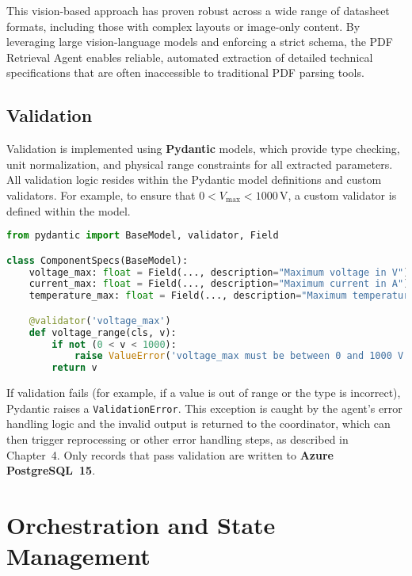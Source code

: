 This vision-based approach has proven robust across a wide range of datasheet formats, including those with complex layouts or image-only content. By leveraging large vision-language models and enforcing a strict schema, the PDF Retrieval Agent enables reliable, automated extraction of detailed technical specifications that are often inaccessible to traditional PDF parsing tools.

\subsection{Validation}
Validation is implemented using \textbf{Pydantic} models, which provide type checking, unit normalization, and physical range constraints for all extracted parameters. All validation logic resides within the Pydantic model definitions and custom validators. For example, to ensure that $0 < V_{\max} < 1000\,\mathrm{V}$, a custom validator is defined within the model.

\begin{lstlisting}[language=python, caption={Example Pydantic model with validation logic.}, label={lst:pydantic_validation}]
from pydantic import BaseModel, validator, Field

class ComponentSpecs(BaseModel):
    voltage_max: float = Field(..., description="Maximum voltage in V")
    current_max: float = Field(..., description="Maximum current in A")
    temperature_max: float = Field(..., description="Maximum temperature in degC")

    @validator('voltage_max')
    def voltage_range(cls, v):
        if not (0 < v < 1000):
            raise ValueError('voltage_max must be between 0 and 1000 V')
        return v
\end{lstlisting}

If validation fails (for example, if a value is out of range or the type is incorrect), Pydantic raises a \texttt{ValidationError}. This exception is caught by the agent's error handling logic and the invalid output is returned to the coordinator, which can then trigger reprocessing or other error handling steps, as described in Chapter~4. Only records that pass validation are written to \textbf{Azure PostgreSQL~15}.

\section{Orchestration and State Management}


